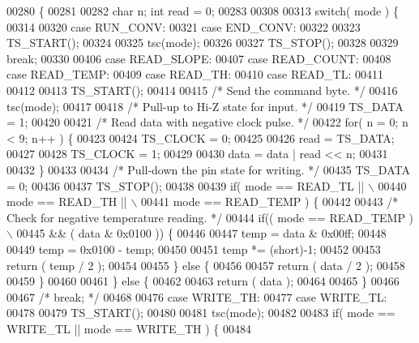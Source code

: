 \begin{DoxyCode}
00280 \{
00281 
00282   \textcolor{keywordtype}{char} n; \textcolor{keywordtype}{int} read = 0;
00283 
00308 \textcolor{preprocessor}{}
00313   \textcolor{keywordflow}{switch}( mode ) \{
00314 
00320     \textcolor{keywordflow}{case} RUN_CONV:
00321     \textcolor{keywordflow}{case} END_CONV:
00322 
00323       TS_START();
00324 
00325       tsc(mode);
00326 
00327       TS_STOP();
00328 
00329       \textcolor{keywordflow}{break};
00330 
00406     \textcolor{keywordflow}{case} READ_SLOPE:
00407     \textcolor{keywordflow}{case} READ_COUNT:
00408     \textcolor{keywordflow}{case} READ_TEMP:
00409     \textcolor{keywordflow}{case} READ_TH:
00410     \textcolor{keywordflow}{case} READ_TL:
00411 
00412 
00413       TS_START();
00414 
00415       \textcolor{comment}{/* Send the command byte. */}
00416       tsc(mode);
00417 
00418       \textcolor{comment}{/* Pull-up to Hi-Z state for input. */}
00419       TS_DATA = 1;
00420 
00421       \textcolor{comment}{/* Read data with negative clock pulse. */}
00422       \textcolor{keywordflow}{for}( n = 0; n < 9; n++ ) \{
00423 
00424         TS_CLOCK = 0;
00425 
00426         read = TS\_DATA;
00427 
00428         TS_CLOCK = 1;
00429 
00430         data = data | read << n;
00431 
00432       \}
00433 
00434       \textcolor{comment}{/* Pull-down the pin state for writing. */}
00435       TS_DATA = 0;
00436 
00437       TS_STOP();
00438 
00439       \textcolor{keywordflow}{if}( mode == READ_TL || \(\backslash\)
00440           mode == READ_TH || \(\backslash\)
00441           mode == READ_TEMP ) \{
00442 
00443         \textcolor{comment}{/* Check for negative temperature reading. */}
00444         \textcolor{keywordflow}{if}(( mode == READ_TEMP ) \(\backslash\)
00445           && ( data & 0x0100 )) \{
00446   
00447             temp = data & 0x00ff;
00448   
00449             temp = 0x0100 - temp;
00450   
00451             temp *= (short)-1;
00452 
00453             \textcolor{keywordflow}{return} ( temp / 2 );
00454   
00455           \} \textcolor{keywordflow}{else} \{
00456 
00457             \textcolor{keywordflow}{return} ( data / 2 );
00458 
00459           \}
00460 
00461       \} \textcolor{keywordflow}{else} \{
00462 
00463         \textcolor{keywordflow}{return} ( data );
00464 
00465       \}
00466 
00467       \textcolor{comment}{/* break; */}
00468 
00476     \textcolor{keywordflow}{case} WRITE_TH:
00477     \textcolor{keywordflow}{case} WRITE_TL:
00478 
00479       TS_START();
00480 
00481       tsc(mode);
00482 
00483       \textcolor{keywordflow}{if}( mode == WRITE_TL || mode == WRITE_TH ) \{
00484 

\end{DoxyCode}
